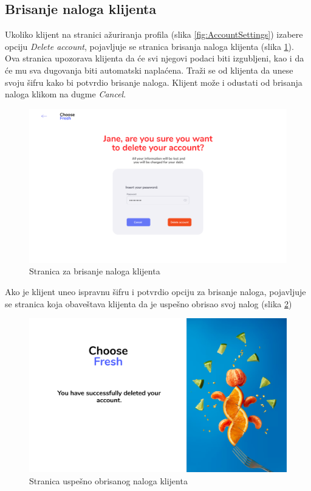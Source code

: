 \subsection{Brisanje naloga klijenta}

Ukoliko klijent na stranici ažuriranja profila (slika \ref{fig:AccountSettings}) izabere opciju \textit{Delete account}, pojavljuje se stranica brisanja naloga klijenta (slika \ref{fig:DeleteAccount}). Ova stranica upozorava klijenta da će svi njegovi podaci biti izgubljeni, kao i da će mu sva dugovanja biti automatski naplaćena. Traži se od klijenta da unese svoju šifru kako bi potvrdio brisanje naloga. Klijent može i odustati od brisanja naloga klikom na dugme \textit{Cancel}.
\begin{figure}[H]
	\begin{center}
		\includegraphics[width=\textwidth]{UI/DeleteAccount.png}
    		\caption{Stranica za brisanje naloga klijenta}
    \label{fig:DeleteAccount}
    \end{center}
\end{figure}

Ako je klijent uneo ispravnu šifru i potvrdio opciju za brisanje naloga, pojavljuje se stranica koja obaveštava klijenta da je uspešno obrisao svoj nalog (slika \ref{fig:DeleteAccountSuccessful})

\begin{figure}[H]
	\begin{center}
		\includegraphics[width=\textwidth]{UI/DeleteAccountSuccessful.png}
    		\caption{Stranica uspešno obrisanog naloga klijenta}
    \label{fig:DeleteAccountSuccessful}
    \end{center}
\end{figure}